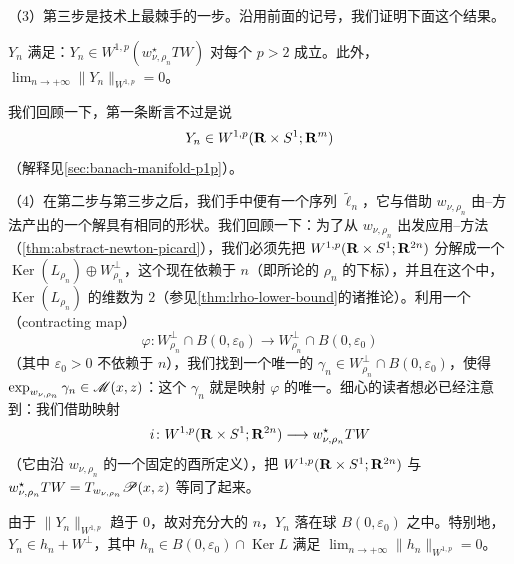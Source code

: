 （3）第三步是技术上最棘手的一步。沿用前面的记号，我们证明下面这个结果。

\begin{proposition}\label{thm:yn-w1p}
\trVectorField{} $Y_{n}$ 满足：$Y_{n}\in W^{1,p}(w_{\nu,\rho_{n}}^{\star}TW)$ 对每个 $p>2$ 成立。此外，$\lim_{n\to+\infty}\|Y_{n}\|_{W^{1,p}}=0$。
\end{proposition}

我们回顾一下，第一条断言不过是说
\[
Y_{n}\in W^{1,p}(\mathbf{R}\times S^{1};\mathbf{R}^{m})
\]
（解释见\cref{sec:banach-manifold-p1p}）。

（4）在第二步与第三步之后，我们手中便有一个序列 $\widetilde{\ell}_{n}$，它与借助\trPregluing{} $w_{\nu,\rho_{n}}$ 由\trNewton--\trPicard{}方法产出的一个解具有相同的形状。我们回顾一下：为了从 $w_{\nu,\rho_{n}}$ 出发应用\trNewton--\trPicard{}方法（\cref{thm:abstract-newton-picard}），我们必须先把 $W^{1,p}(\mathbf{R}\times S^{1};\mathbf{R}^{2n})$ 分解成一个\trDirectSum{} $\operatorname{Ker}(L_{\rho_{n}})\oplus W_{\rho_{n}}^{\perp}$，这个\trDirectSum{}现在依赖于 $n$（即所论的 $\rho_{n}$ 的下标），并且在这个\trDirectSum{}中，$\operatorname{Ker}(L_{\rho_{n}})$ 的维数为 $2$（参见\cref{thm:lrho-lower-bound}的诸推论）。利用一个\textbf{\trContractingMap}（contracting map）
\[
\varphi\colon W_{\rho_{n}}^{\perp}\cap B(0,\varepsilon_{0})\longrightarrow W_{\rho_{n}}^{\perp}\cap B(0,\varepsilon_{0})
\]
（其中 $\varepsilon_{0}>0$ 不依赖于 $n$），我们找到一个唯一的 $\gamma_{n}\in W_{\rho_{n}}^{\perp}\cap B(0,\varepsilon_{0})$，使得 $\exp_{w_{\nu,\rho_{n}}}\gamma_{n}\in\mathscr{M}(x,z)$：这个 $\gamma_{n}$ 就是映射 $\varphi$ 的唯一\trFixedPoint。细心的读者想必已经注意到：我们借助映射
\[
i\colon W^{1,p}(\mathbf{R}\times S^{1};\mathbf{R}^{2n})\longrightarrow w_{\nu,\rho_{n}}^{\star}TW
\]
（它由沿 $w_{\nu,\rho_{n}}$ 的一个固定的酉\trTrivialization{}所定义），把 $W^{1,p}(\mathbf{R}\times S^{1};\mathbf{R}^{2n})$ 与 $w_{\nu,\rho_{n}}^{\star}TW=T_{w_{\nu,\rho_{n}}}\mathscr{P}(x,z)$ 等同了起来。

由于 $\|Y_{n}\|_{W^{1,p}}$ 趋于 $0$，故对充分大的 $n$，$Y_{n}$ 落在球 $B(0,\varepsilon_{0})$ 之中。特别地，$Y_{n}\in h_{n}+W^{\perp}$，其中 $h_{n}\in B(0,\varepsilon_{0})\cap\operatorname{Ker}L$ 满足 $\lim_{n\to+\infty}\|h_{n}\|_{W^{1,p}}=0$。

